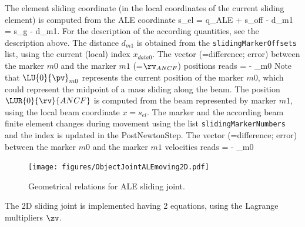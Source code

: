 %
    \finishTable

    The element sliding coordinate (in the local coordinates of the current sliding element) is computed from the ALE coordinate
    \be
      s_{el} = q_{ALE} + s_{off} - d_{m1} = s_g - d_{m1}.
    \ee
		For the description of the according quantities, see the description above. The distance $d_{m1}$ is obtained from the \texttt{slidingMarkerOffsets} list, using the current (local) index $x_{data0}$.
    The vector (=difference; error) between the marker $m0$ and the marker $m1$ (=$\rv_{ANCF}$) positions reads
    \be
       =  - _{m0}
    \ee
		Note that $\LU{0}{\pv}_{m0}$ represents the current position of the marker $m0$, which could represent the midpoint of a mass sliding along the beam.
		The position $\LUR{0}{\rv}{ANCF}$ is computed from the beam represented by marker $m1$, using the local beam coordinate $x=s_{el}$. The marker and the according beam finite element changes during movement using the list \texttt{slidingMarkerNumbers } and the index is updated in the PostNewtonStep.
    The vector (=difference; error) between the marker $m0$ and the marker $m1$ velocities reads
    \be
       =  - _{m0}
    \ee
%
		\begin{figure}[tbh]
		\label{fig:ObjectJointALEmoving2D}
    \begin{center}
        \texttt{[image: figures/ObjectJointALEmoving2D.pdf]}
    \end{center}
		\caption{Geometrical relations for ALE sliding joint.}
		\end{figure}
    The 2D sliding joint is implemented having 2 equations, using the Lagrange multipliers $\zv$. 
